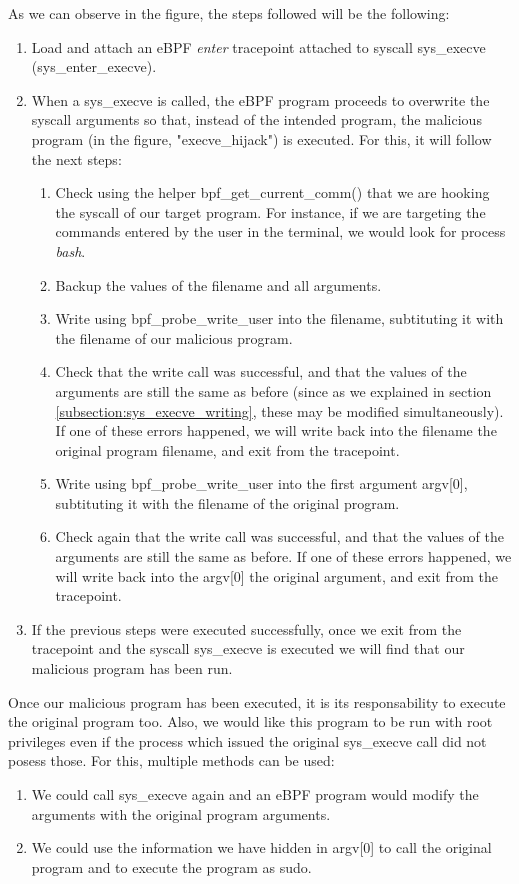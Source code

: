 As we can observe in the figure, the steps followed will be the following:
\begin{enumerate}
\item Load and attach an eBPF \textit{enter} tracepoint attached to syscall sys\_execve (sys\_enter\_execve). 
\item When a sys\_execve is called, the eBPF program proceeds to overwrite the syscall arguments so that, instead of the intended program, the malicious program (in the figure, "execve\_hijack") is executed. For this, it will follow the next steps:

\begin{enumerate}
	\item Check using the helper bpf\_get\_current\_comm() that we are hooking the syscall of our target program. For instance, if we are targeting the commands entered by the user in the terminal, we would look for process \textit{bash}.
	\item Backup the values of the filename and all arguments.
	\item Write using bpf\_probe\_write\_user into the filename, subtituting it with the filename of our malicious program.
	\item Check that the write call was successful, and that the values of the arguments are still the same as before (since as we explained in section \ref{subsection:sys_execve_writing}, these may be modified simultaneously). If one of these errors happened, we will write back into the filename the original program filename, and exit from the tracepoint.
	\item Write using bpf\_probe\_write\_user into the first argument argv[0], subtituting it with the filename of the original program.
	\item Check again that the write call was successful, and that the values of the arguments are still the same as before. If one of these errors happened, we will write back into the argv[0] the original argument, and exit from the tracepoint.
\end{enumerate}
\item If the previous steps were executed successfully, once we exit from the tracepoint and the syscall sys\_execve is executed we will find that our malicious program has been run.
\end{enumerate}

Once our malicious program has been executed, it is its responsability to execute the original program too. Also, we would like this program to be run with root privileges even if the process which issued the original sys\_execve call did not posess those. For this, multiple methods can be used:
\begin{enumerate}
\item We could call sys\_execve again and an eBPF program would modify the arguments with the original program arguments.
\item We could use the information we have hidden in argv[0] to call the original program and to execute the program as sudo.
\end{enumerate}


